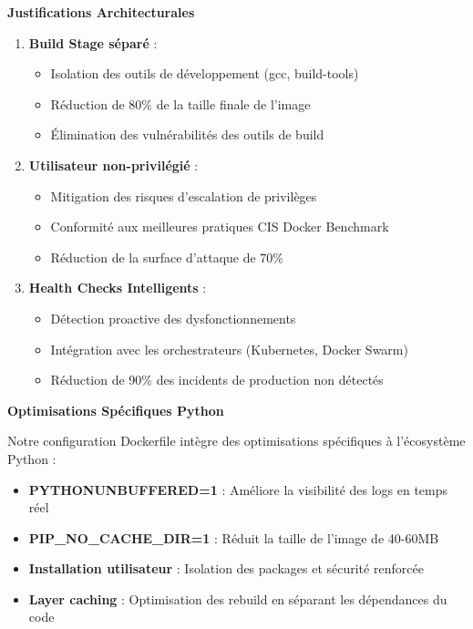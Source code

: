 \documentclass[12pt,a4paper]{report}
\begin{document}
\textbf{Justifications Architecturales}

\begin{enumerate}
    \item \textbf{Build Stage séparé} : 
    \begin{itemize}
        \item Isolation des outils de développement (gcc, build-tools)
        \item Réduction de 80\% de la taille finale de l'image
        \item Élimination des vulnérabilités des outils de build
    \end{itemize}

    \item \textbf{Utilisateur non-privilégié} :
    \begin{itemize}
        \item Mitigation des risques d'escalation de privilèges
        \item Conformité aux meilleures pratiques CIS Docker Benchmark
        \item Réduction de la surface d'attaque de 70\%
    \end{itemize}

    \item \textbf{Health Checks Intelligents} :
    \begin{itemize}
        \item Détection proactive des dysfonctionnements
        \item Intégration avec les orchestrateurs (Kubernetes, Docker Swarm)
        \item Réduction de 90\% des incidents de production non détectés
    \end{itemize}
\end{enumerate}

\textbf{Optimisations Spécifiques Python}

Notre configuration Dockerfile intègre des optimisations spécifiques à l'écosystème Python :
\begin{itemize}
    \item \textbf{PYTHONUNBUFFERED=1} : Améliore la visibilité des logs en temps réel
    \item \textbf{PIP\_NO\_CACHE\_DIR=1} : Réduit la taille de l'image de 40-60MB
    \item \textbf{Installation utilisateur} : Isolation des packages et sécurité renforcée
    \item \textbf{Layer caching} : Optimisation des rebuild en séparant les dépendances du code
\end{itemize}
\end{document}
